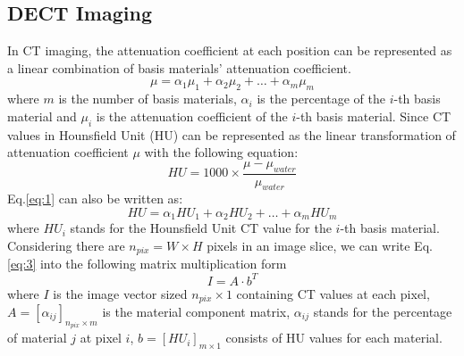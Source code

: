 \documentclass[journal,twoside,web]{ieeecolor}
\begin{document}
\subsection{DECT Imaging}
In CT imaging, the attenuation coefficient at each position can be represented as a linear combination of basis materials’ attenuation coefficient\cite{ref50}.
\begin{equation}
    \mu=\alpha_1\mu_1+\alpha_2\mu_2+\dots+\alpha_m\mu_m
    \label{eq:1}
\end{equation}
where \(m\) is the number of basis materials, \(\alpha_i\) is the percentage of the \(i\)-th basis material and \(\mu_i\) is the attenuation coefficient of the \(i\)-th basis material. Since CT values in Hounsfield Unit (HU) can be represented as the linear transformation of attenuation coefficient \(\mu\) with the following equation:
\begin{equation}
    HU=1000\times\frac{\mu-\mu_{water}}{\mu_{water}}
    \label{eq:2}
\end{equation}
Eq.\eqref{eq:1} can also be written as:
\begin{equation}
    HU=\alpha_{1}HU_{1}+\alpha_{2}HU_{2}+\dots+\alpha_{m}HU_{m}
    \label{eq:3}
\end{equation}
where \(HU_{i}\) stands for the Hounsfield Unit CT value for the \(i\)-th basis material.
Considering there are \(n_{pix}=W{\times}H\) pixels in an image slice, we can write Eq.\eqref{eq:3} into the following matrix multiplication form
\begin{equation}
    I=A\cdot{b}^T
    \label{eq:4}
\end{equation}
where \(I\) is the image vector sized \(n_{pix}{\times}1\) containing  CT values at each pixel, \(A={[\alpha_{ij}]}_{n_{pix}{\times}m}\) is the material component matrix, \(\alpha_{ij}\) stands for the percentage of material \(j\) at pixel \(i\), \(b={[HU_i]}_{m{\times}1}\) consists of HU values for each material.
\end{document}
